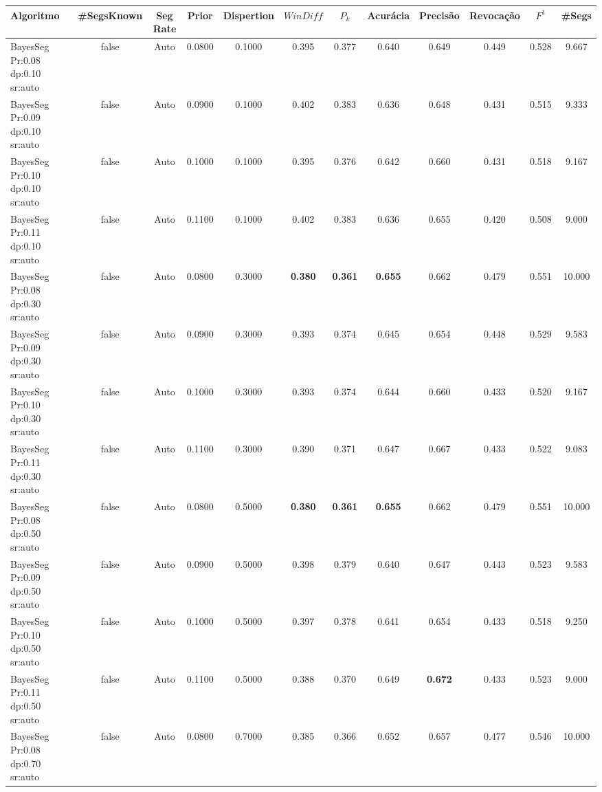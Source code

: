\documentclass{article}
\begin{document}
\newpage
\begin{longtable}[c]{|l|c|c|c|c|c|c|c|c|c|c|c|} 
\hline 
Algoritmo & \#SegsKnown & Seg Rate & Prior & Dispertion & $WinDiff$ & $P_k$ & Acurácia & Precisão & Revocação & $F^1$ & \#Segs\\ \hline 
BayesSeg Pr:0.08 dp:0.10 sr:auto & false & Auto & 0.0800 & 0.1000 & 0.395 & 0.377 & 0.640 & 0.649 & 0.449 & 0.528 & 9.667  \\ \hline 
 BayesSeg Pr:0.09 dp:0.10 sr:auto & false & Auto & 0.0900 & 0.1000 & 0.402 & 0.383 & 0.636 & 0.648 & 0.431 & 0.515 & 9.333  \\ \hline 
 BayesSeg Pr:0.10 dp:0.10 sr:auto & false & Auto & 0.1000 & 0.1000 & 0.395 & 0.376 & 0.642 & 0.660 & 0.431 & 0.518 & 9.167  \\ \hline 
 BayesSeg Pr:0.11 dp:0.10 sr:auto & false & Auto & 0.1100 & 0.1000 & 0.402 & 0.383 & 0.636 & 0.655 & 0.420 & 0.508 & 9.000  \\ \hline 
 BayesSeg Pr:0.08 dp:0.30 sr:auto & false & Auto & 0.0800 & 0.3000 & \cellcolor{gray!20} \textbf{0.380} & \cellcolor{gray!20} \textbf{0.361} & \cellcolor{gray!20} \textbf{0.655} & 0.662 & 0.479 & 0.551 & 10.000  \\ \hline 
 BayesSeg Pr:0.09 dp:0.30 sr:auto & false & Auto & 0.0900 & 0.3000 & 0.393 & 0.374 & 0.645 & 0.654 & 0.448 & 0.529 & 9.583  \\ \hline 
 BayesSeg Pr:0.10 dp:0.30 sr:auto & false & Auto & 0.1000 & 0.3000 & 0.393 & 0.374 & 0.644 & 0.660 & 0.433 & 0.520 & 9.167  \\ \hline 
 BayesSeg Pr:0.11 dp:0.30 sr:auto & false & Auto & 0.1100 & 0.3000 & 0.390 & 0.371 & 0.647 & 0.667 & 0.433 & 0.522 & 9.083  \\ \hline 
 BayesSeg Pr:0.08 dp:0.50 sr:auto & false & Auto & 0.0800 & 0.5000 & \cellcolor{gray!20} \textbf{0.380} & \cellcolor{gray!20} \textbf{0.361} & \cellcolor{gray!20} \textbf{0.655} & 0.662 & 0.479 & 0.551 & 10.000  \\ \hline 
 BayesSeg Pr:0.09 dp:0.50 sr:auto & false & Auto & 0.0900 & 0.5000 & 0.398 & 0.379 & 0.640 & 0.647 & 0.443 & 0.523 & 9.583  \\ \hline 
 BayesSeg Pr:0.10 dp:0.50 sr:auto & false & Auto & 0.1000 & 0.5000 & 0.397 & 0.378 & 0.641 & 0.654 & 0.433 & 0.518 & 9.250  \\ \hline 
 BayesSeg Pr:0.11 dp:0.50 sr:auto & false & Auto & 0.1100 & 0.5000 & 0.388 & 0.370 & 0.649 & \cellcolor{gray!20} \textbf{0.672} & 0.433 & 0.523 & 9.000  \\ \hline 
 BayesSeg Pr:0.08 dp:0.70 sr:auto & false & Auto & 0.0800 & 0.7000 & 0.385 & 0.366 & 0.652 & 0.657 & 0.477 & 0.546 & 10.000  \\ \hline 

\end{longtable}
\end{document}
